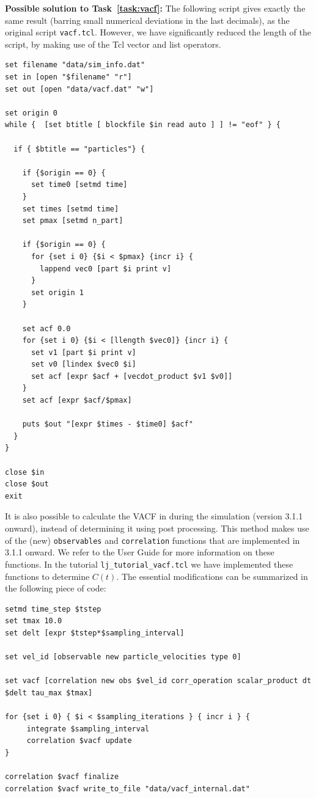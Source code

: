 \documentclass[
paper=a4,                       %
fontsize=11pt,                  %
twoside,                        %
footsepline,                    %
headsepline,                    %
headinclude=false,              %
footinclude=false,              %
pagesize,                       %
]{scrartcl}
\begin{document}
\textbf{Possible solution to Task~\ref{task:vacf}:} The following script gives exactly the same result (barring small numerical deviations in the last decimals), as the original script \texttt{vacf.tcl}. However, we have significantly reduced the length of the script, by making use of the Tcl vector and list operators.

{\small\vspace{0,2cm}
\begin{lstlisting}[numbers=none]
set filename "data/sim_info.dat"
set in [open "$filename" "r"]
set out [open "data/vacf.dat" "w"]

set origin 0
while {  [set btitle [ blockfile $in read auto ] ] != "eof" } {

  if { $btitle == "particles"} {

    if {$origin == 0} {
      set time0 [setmd time]
    }
    set times [setmd time]
    set pmax [setmd n_part]

    if {$origin == 0} {
      for {set i 0} {$i < $pmax} {incr i} {
        lappend vec0 [part $i print v]
      }
      set origin 1
    }

    set acf 0.0
    for {set i 0} {$i < [llength $vec0]} {incr i} {
      set v1 [part $i print v]
      set v0 [lindex $vec0 $i]
      set acf [expr $acf + [vecdot_product $v1 $v0]]
    }
    set acf [expr $acf/$pmax]

    puts $out "[expr $times - $time0] $acf"
  }
}

close $in
close $out
exit
\end{lstlisting}\vspace{0,2cm}
}

\noindent It is also possible to calculate the VACF in \es{} during the simulation (version 3.1.1 onward), instead of determining it using post processing. This method makes use of the (new) \lstinline|observables| and \lstinline|correlation| functions that are implemented in \es{} 3.1.1 onward. We refer to the User Guide for more information on these functions. In the tutorial \texttt{lj\_tutorial\_vacf.tcl} we have implemented these functions to determine $C(t)$. The essential modifications can be summarized in the following piece of code:

{\small\vspace{0,2cm}
\begin{lstlisting}[numbers=none]
setmd time_step $tstep
set tmax 10.0
set delt [expr $tstep*$sampling_interval]

set vel_id [observable new particle_velocities type 0]

set vacf [correlation new obs $vel_id corr_operation scalar_product dt $delt tau_max $tmax]

for {set i 0} { $i < $sampling_iterations } { incr i } {
     integrate $sampling_interval
     correlation $vacf update
}

correlation $vacf finalize
correlation $vacf write_to_file "data/vacf_internal.dat"
\end{lstlisting}\vspace{0,2cm}
}
\end{document}
